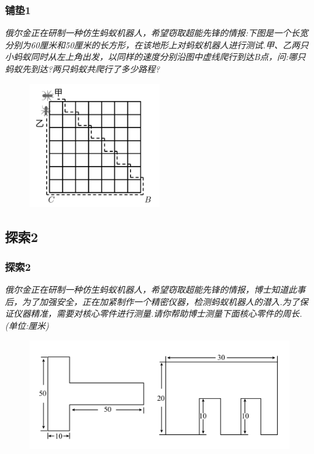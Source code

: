 \begin{frame}
    \frametitle{铺垫1}
    \textit{俄尔金正在研制一种仿生蚂蚁机器人，希望窃取超能先锋的情报:下图是一个长宽分别为60厘米和50厘米的长方形，在该地形上对蚂蚁机器人进行测试.甲、乙两只小蚂蚁同时从左上角出发，以同样的速度分别沿图中虚线爬行到达B点，问:哪只蚂蚁先到达?两只蚂蚁共爬行了多少路程?}
    \begin{figure}[H] 
        \centering
        \includegraphics[width=0.5\textwidth]{./pics/Chapter_1/pudian1.png}
    \end{figure}
\end{frame}

\subsection{探索2}
\begin{frame}
    \frametitle{探索2}
    \textit{俄尔金正在研制一种仿生蚂蚁机器人，希望窃取超能先锋的情报，博士知道此事后，为了加强安全，正在加紧制作一个精密仪器，检测蚂蚁机器人的潜入.为了保证仪器精准，需要对核心零件进行测量.请你帮助博士测量下面核心零件的周长.(单位:厘米)}
    \begin{figure}[H] 
        \centering
        \includegraphics[width=1\textwidth]{./pics/Chapter_1/tansuo2.png}
    \end{figure}
\end{frame}

